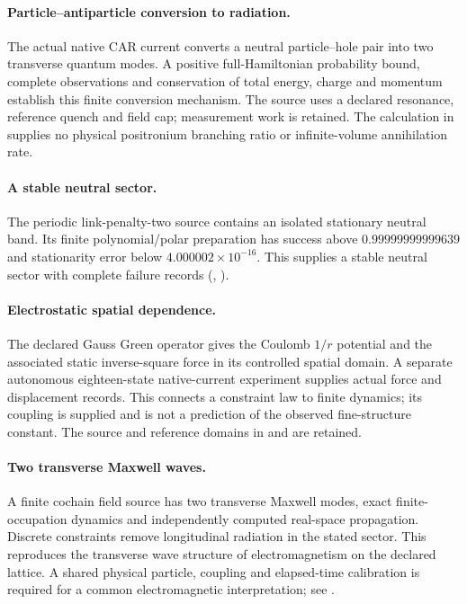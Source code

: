 \paragraph{Particle--antiparticle conversion to radiation.}
The actual native CAR current converts a neutral particle--hole pair
into two transverse quantum modes. A positive full-Hamiltonian
probability bound, complete observations and conservation of total
energy, charge and momentum establish this finite conversion mechanism.
The source uses a declared resonance, reference quench and field cap;
measurement work is retained. The calculation in
 supplies no physical positronium
branching ratio or infinite-volume annihilation rate.

\paragraph{A stable neutral sector.}
The periodic link-penalty-two source contains an isolated stationary
neutral band. Its finite polynomial/polar preparation has success above
$0.99999999999639$ and stationarity error below $4.000002\times10^{-16}$.
This supplies a stable neutral sector with complete failure records
(,
).

\paragraph{Electrostatic spatial dependence.}
The declared Gauss Green operator gives the Coulomb $1/r$ potential and
the associated static inverse-square force in its controlled spatial
domain. A separate autonomous eighteen-state native-current experiment
supplies actual force and displacement records. This connects a
constraint law to finite dynamics; its coupling is supplied and is not
a prediction of the observed fine-structure constant. The source and
reference domains in  and
 are retained.

\paragraph{Two transverse Maxwell waves.}
A finite cochain field source has two transverse Maxwell modes, exact
finite-occupation dynamics and independently computed real-space
propagation. Discrete constraints remove longitudinal radiation in the
stated sector. This reproduces the transverse wave structure of
electromagnetism on the declared lattice. A shared physical particle,
coupling and elapsed-time calibration is required for a common
electromagnetic interpretation; see
.

